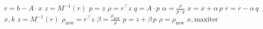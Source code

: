 

\begin{algorithmic}
\State $r = b - A \cdot x$                                         %
\State $z = M^{-1}(r)$                                             %
\State $p = z$                                                      %
\State $\rho = r^\top z$                                            %
    \State $q = A \cdot p$                                          %
    \State $\alpha = \frac{\rho}{p^\top q}$                         %
    \State $x = x + \alpha \, p$                                    %
    \State $r = r - \alpha \, q$                                    %
        \Return $x, k$
    \EndIf
    \State $z = M^{-1}(r)$                                         %
    \State $\rho_{\text{new}} = r^\top z$                           %
    \State $\beta = \frac{\rho_{\text{new}}}{\rho}$                 %
    \State $p = z + \beta \, p$                                     %
    \State $\rho = \rho_{\text{new}}$                               %
\EndFor
\Return $x, \text{maxiter}$
\end{algorithmic}
